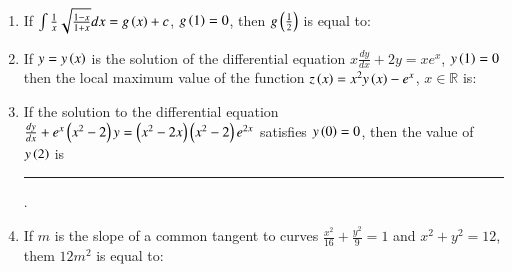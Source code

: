 \documentclass[journal,12pt,onecolumn]{IEEEtran}
\theoremstyle{remark}
\begin{document}
\begin{enumerate}
\item If $\int\frac{1}{x}\sqrt{\frac{1-x}{1+x}}dx=g\left(x\right)+c$, $g\left(1\right)=0$, then $g\left(\frac{1}{2}\right)$ is equal to:

\hfill{}
\begin{enumerate}
\end{enumerate}

\item If $y=y\left(x\right)$ is the solution of the differential equation $x\frac{dy}{dx}+2y=xe^x$, $y\left(1\right)=0$ then the local maximum value of the function $z\left(x\right)=x^2 y\left(x\right) - e^x$, $x \in \mathbb{R}$ is:

\hfill{}
\begin{enumerate}
\end{enumerate}

\item If the solution to the differential equation $\frac{dy}{dx}+e^{x}\left(x^2-2\right)y=\left(x^2-2x\right)\left(x^2-2\right)e^{2x}$ satisfies $y\left(0\right)=0$, then the value of $y\left(2\right)$ is \rule{1cm}{0.15mm}.

\hfill{}
\begin{enumerate}
\end{enumerate}

\item If $m$ is the slope of a common tangent to curves $\frac{x^2}{16}+\frac{y^2}{9}=1$ and $x^2+y^2=12$, them $12m^2$ is equal to:


\end{enumerate}
\end{document}
